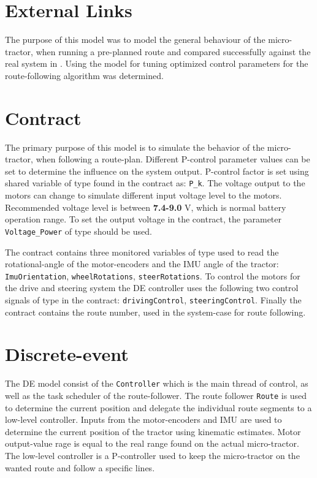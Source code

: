 \section{External Links}
The purpose of this model was to model the general behaviour of the
micro-tractor, when running a pre-planned route and compared
successfully against the real system in \cite{Christiansen&12a}.
Using the \DESTECS model for tuning optimized control parameters for
the route-following algorithm was determined.

\section{Contract}
The primary purpose of this model is to simulate the behavior of the
micro-tractor, when following a route-plan.  Different P-control
parameter values can be set to determine the influence on the system
output.  P-control factor is set using shared variable of type
 found in the contract as: \texttt{P\_k}.  The voltage
output to the motors can change to simulate different input voltage
level to the motors.  Recommended voltage level is between
\textbf{7.4-9.0} V, which is normal battery operation range.  To set
the output voltage in the contract, the parameter
\texttt{Voltage\_Power} of type  should be used.

The contract contains three monitored variables of type 
used to read the rotational-angle of the motor-encoders and the IMU
angle of the tractor: \texttt{ImuOrientation},
\texttt{wheelRotations}, \texttt{steerRotations}.  To control the
motors for the drive and steering system the DE controller uses the
following two control signals of type  in the contract:
\texttt{drivingControl}, \texttt{steering\-Control}.  Finally the
contract contains the route number, used in the system-case for route
following.

\section{Discrete-event}
The DE model consist of the \texttt{Controller} which is the main
thread of control, as well as the task scheduler of the
route-follower.  The route follower \texttt{Route} is used to determine the current
position and delegate the individual route segments to a low-level
controller.  Inputs from the motor-encoders and IMU are used to
determine the current position of the tractor using kinematic
estimates.  Motor output-value rage is equal to the real range found
on the actual micro-tractor.  The low-level controller is a
P-controller used to keep the micro-tractor on the wanted route and
follow a specific lines.

